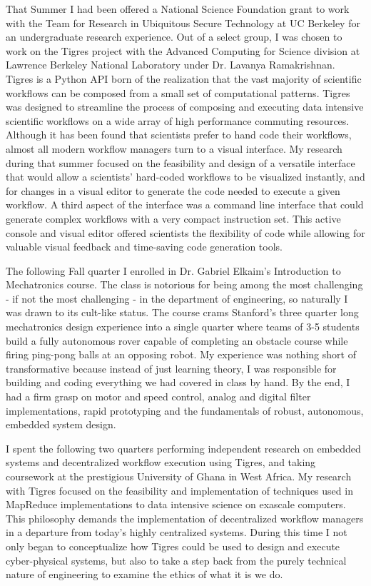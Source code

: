 \documentclass[journal, draftcls]{IEEEtran}
\begin{document}
That Summer I had been offered a National Science Foundation grant to work with the Team for Research in Ubiquitous Secure Technology at UC Berkeley for an undergraduate research experience. Out of a select group, I was chosen to work on the Tigres project with the Advanced Computing for Science division at Lawrence Berkeley National Laboratory under Dr. Lavanya Ramakrishnan. Tigres is a Python API born of the realization that the vast majority of scientific workflows can be composed from a small set of computational patterns. Tigres was designed to streamline the process of composing and executing data intensive scientific workflows on a wide array of high performance commuting resources. Although it has been found that scientists prefer to hand code their workflows, almost all modern workflow managers turn to a visual interface. My research during that summer focused on the feasibility and design of a versatile interface that would allow a scientists' hard-coded workflows to be visualized instantly, and for changes in a visual editor to generate the code needed to execute a given workflow. A third aspect of the interface was a command line interface that could generate complex workflows with a very compact instruction set. This active console and visual editor offered scientists the flexibility of code while allowing for valuable visual feedback and time-saving code generation tools. 

 The following Fall quarter I enrolled in Dr. Gabriel Elkaim's Introduction to Mechatronics course. The class is notorious for being among the most challenging - if not the most challenging - in the department of engineering, so naturally I was drawn to its cult-like status. The course crams Stanford's three quarter long mechatronics design experience into a single quarter where teams of 3-5 students build a fully autonomous rover capable of completing an obstacle course while firing ping-pong balls at an opposing robot. My experience was nothing short of transformative because instead of just learning theory, I was responsible for building and coding everything we had covered in class by hand. By the end, I had a firm grasp on motor and speed control, analog and digital filter implementations, rapid prototyping and the fundamentals of robust, autonomous, embedded system design. 
 
 I spent the following two quarters performing independent research on embedded systems and decentralized workflow execution using Tigres, and taking coursework at the prestigious University of Ghana in West Africa. My research with Tigres  focused on the feasibility and implementation of techniques used in MapReduce implementations to data intensive science on exascale computers. This philosophy demands the implementation of decentralized workflow managers in a departure from today's highly centralized systems. During this time I not only began to conceptualize how Tigres could be used to design and execute cyber-physical systems, but also to take a step back from the purely technical nature of engineering to examine the ethics of what it is we do. 
 
\end{document}
